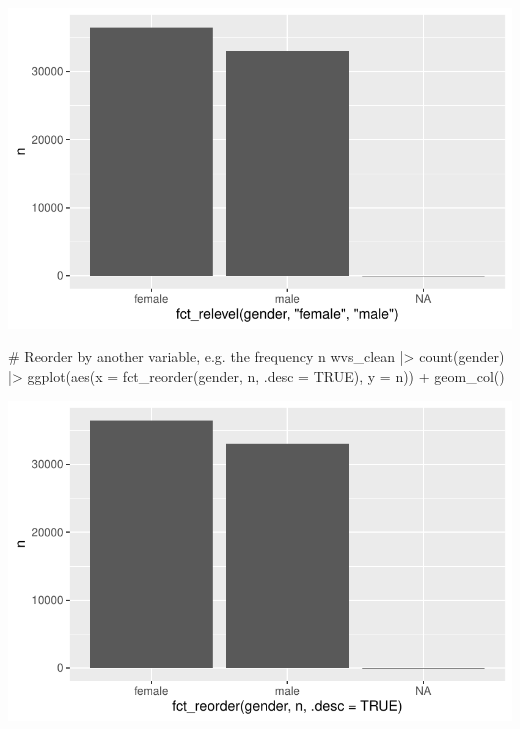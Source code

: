 \documentclass[
  letterpaper,
]{krantz}
\makeatletter
\newenvironment{Shaded}{\begin{snugshade}}{\end{snugshade}}
\newcommand{\AttributeTok}[1]{\textcolor[rgb]{0.40,0.45,0.13}{#1}}
\newcommand{\CommentTok}[1]{\textcolor[rgb]{0.37,0.37,0.37}{#1}}
\newcommand{\ConstantTok}[1]{\textcolor[rgb]{0.56,0.35,0.01}{#1}}
\newcommand{\FunctionTok}[1]{\textcolor[rgb]{0.28,0.35,0.67}{#1}}
\newcommand{\NormalTok}[1]{\textcolor[rgb]{0.00,0.23,0.31}{#1}}
\newcommand{\SpecialCharTok}[1]{\textcolor[rgb]{0.37,0.37,0.37}{#1}}
\newenvironment{kframe}{%
\medskip{}
\setlength{\fboxsep}{.8em}
 \def\at@end@of@kframe{}%
 \ifinner\ifhmode%
  \def\at@end@of@kframe{\end{minipage}}%
  \begin{minipage}{\columnwidth}%
 \fi\fi%
 \def\FrameCommand##1{\hskip\@totalleftmargin \hskip-\fboxsep
 \colorbox{shadecolor}{##1}\hskip-\fboxsep
     \hskip-\linewidth \hskip-\@totalleftmargin \hskip\columnwidth}%
 \MakeFramed {\advance\hsize-\width
   \@totalleftmargin\z@ \linewidth\hsize
   \@setminipage}}%
 {\par\unskip\endMakeFramed%
 \at@end@of@kframe}
\renewenvironment{Shaded}{\begin{kframe}}{\end{kframe}}
\makeatother
\begin{document}
\includegraphics{07_data_wrangling_files/figure-pdf/reorder-factor-levels-forcats-1.pdf}

\begin{Shaded}
\begin{Highlighting}[]
\CommentTok{\# Reorder by another variable, e.g. the frequency \textquotesingle{}n\textquotesingle{}}
\NormalTok{wvs\_clean }\SpecialCharTok{|\textgreater{}}
  \FunctionTok{count}\NormalTok{(gender) }\SpecialCharTok{|\textgreater{}}
  \FunctionTok{ggplot}\NormalTok{(}\FunctionTok{aes}\NormalTok{(}\AttributeTok{x =} \FunctionTok{fct\_reorder}\NormalTok{(gender, n, }\AttributeTok{.desc =} \ConstantTok{TRUE}\NormalTok{),}
             \AttributeTok{y =}\NormalTok{ n)) }\SpecialCharTok{+}
  \FunctionTok{geom\_col}\NormalTok{()}
\end{Highlighting}
\end{Shaded}

\includegraphics{07_data_wrangling_files/figure-pdf/reorder-by-other-variable-1.pdf}
\end{document}
